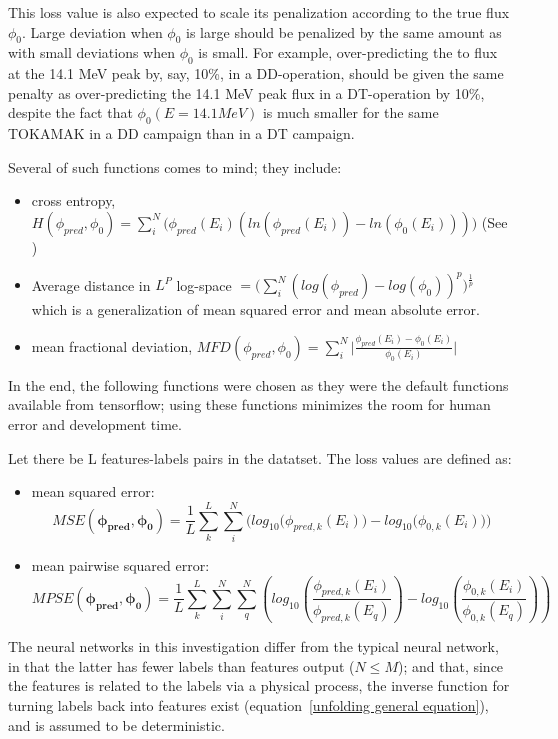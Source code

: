 \documentclass[a4paper, 12pt]{article}
\newcommand{\ve}[1]{\boldsymbol{#1}}
\begin{document}
    This loss value is also expected to scale its penalization according to the true flux $\phi_{0}$. Large deviation when $\phi_0$ is large should be penalized by the same amount as with small deviations when $\phi_{0}$ is small. For example, over-predicting the to flux at the 14.1 MeV peak by, say, 10\%, in a DD-operation, should be given the same penalty as over-predicting the 14.1 MeV peak flux in a DT-operation by 10\%, despite the fact that $\phi_{0}(E=14.1 MeV)$ is much smaller for the same TOKAMAK in a DD campaign than in a DT campaign.

    Several of such functions comes to mind; they include:

    \begin{itemize}
        \item cross entropy, $H(\phi_{pred}, \phi_{0}) = \sum_i^N \bigg(\phi_{pred}(E_i)(ln(\phi_{pred}(E_i)) - ln(\phi_{0}(E_i)))\bigg)$ (See \cite{Johnson-Shore-Deriv})
        \item Average distance in $L^P$ log-space $=\bigg(\sum_i^N(log(\phi_{pred})-log(\phi_{0}))^p\bigg)^{\frac{1}{p}}$
        which is a generalization of mean squared error and mean absolute error.
        \item mean fractional deviation, $MFD (\phi_{pred}, \phi_{0}) = \sum_i^N \bigg|\frac{\phi_{pred}(E_i)-\phi_0(E_i)}{\phi_{0}(E_i)}\bigg|$
    \end{itemize}

    In the end, the following functions were chosen as they were the default functions available from tensorflow; using these functions minimizes the room for human error and development time.

    Let there be L features-labels pairs in the datatset. The loss values are defined as:
    \begin{itemize}
        \item mean squared error:
        \begin{equation}
            MSE(\ve{\phi_{pred}},\ve{\phi_0}) = \frac{1}{L} \sum_{k}^L \sum_i^N \bigg( log_{10}\big(\phi_{pred,k}(E_i)\big)-log_{10}\big(\phi_{0,k}(E_i)\big) \bigg)
        \end{equation}
        \item mean pairwise squared error:
        \begin{equation}
            MPSE(\ve{\phi_{pred}}, \ve{\phi_{0}}) = \frac{1}{L} \sum_{k}^L \sum_i^N \sum_q^N \left( log_{10}\left(\frac{\phi_{pred,k}(E_i)}{\phi_{pred,k}(E_q)}\right)-log_{10}\left(\frac{\phi_{0,k}(E_i)}{\phi_{0,k}(E_q)}\right) \right)
        \end{equation}

    \end{itemize}
    The neural networks in this investigation differ from the typical neural network, in that the latter has fewer labels than features output ($N \le M$); and that, since the features is related to the labels via a physical process, the inverse function for turning labels back into features exist (equation~\ref{unfolding general equation}), and is assumed to be deterministic.
    
\end{document}
